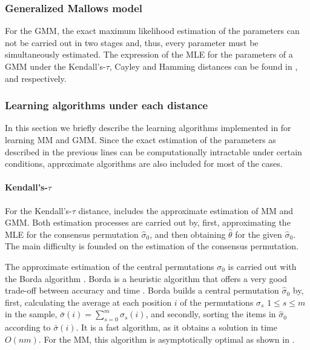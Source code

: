\documentclass[article,nojss]{jss}
\begin{document}
\subsubsection{Generalized Mallows model}%
For the GMM, the exact maximum likelihood estimation of the parameters can not be carried out in two stages and, thus, every parameter must be simultaneously estimated. The expression of the MLE for the parameters of a GMM under the Kendall's-$\tau$, Cayley and Hamming distances can be found in \cite{Mandhani2009}, \cite{Irurozki2014b} and \cite{Irurozki2014a} respectively. 


\subsubsection{Learning algorithms under each distance}%
In this section we briefly describe the learning algorithms implemented in  for learning MM and GMM. Since the exact estimation of the parameters as described in the previous lines can be computationally intractable under certain conditions, approximate algorithms are also included for most of the cases. 

\paragraph{Kendall's-$\tau$}
For the Kendall's-$\tau$ distance,  includes the approximate estimation of MM and GMM. Both estimation processes are carried out by, first, approximating the MLE for the consensus permutation $\hat \sigma_0$, and then obtaining $\hat \theta$ for the given $\hat\sigma_0$. The main difficulty is founded on the estimation of the consensus permutation. 

The approximate estimation of the central permutations $\sigma_0$ is carried out with the Borda algorithm \citep{Borda1781}. Borda is a heuristic algorithm that offers a very good trade-off between accuracy and time \citep{Ali2011}. Borda builds a central permutation $\hat \sigma_0$ by, first, calculating the average at each position $i$ of the permutations $\sigma_s$ $1\leq s \leq m$ in the sample, $\bar \sigma(i) = \sum_{s=0}^m \sigma_s(i)$, and secondly, sorting the items in $\hat \sigma_0$ according to $\bar \sigma(i)$. It is a fast algorithm, as it obtains a solution in time $O(nm)$. For the MM, this algorithm is asymptotically optimal as shown in \cite{gMallows}. 
\end{document}
